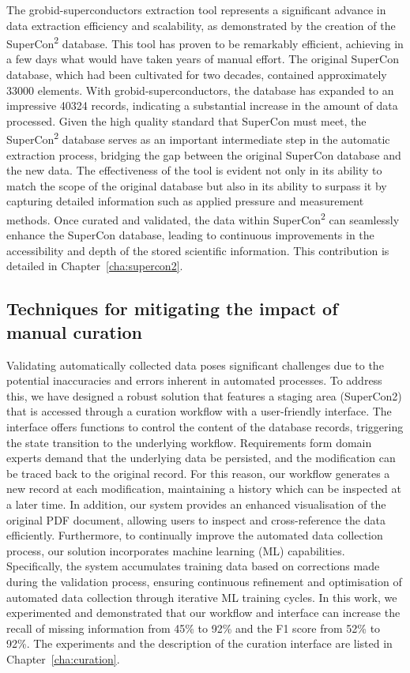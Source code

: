 The grobid-superconductors extraction tool represents a significant advance in data extraction efficiency and scalability, as demonstrated by the creation of the SuperCon\textsuperscript{2} database. 
This tool has proven to be remarkably efficient, achieving in a few days what would have taken years of manual effort. 
The original SuperCon database, which had been cultivated for two decades, contained approximately 33000 elements. 
With grobid-superconductors, the database has expanded to an impressive 40324 records, indicating a substantial increase in the amount of data processed. 
Given the high quality standard that SuperCon must meet, the SuperCon\textsuperscript{2} database serves as an important intermediate step in the automatic extraction process, bridging the gap between the original SuperCon database and the new data. 
The effectiveness of the tool is evident not only in its ability to match the scope of the original database but also in its ability to surpass it by capturing detailed information such as applied pressure and measurement methods. Once curated and validated, the data within SuperCon\textsuperscript{2} can seamlessly enhance the SuperCon database, leading to continuous improvements in the accessibility and depth of the stored scientific information.
This contribution is detailed in Chapter~\ref{cha:supercon2}.

\subsection{Techniques for mitigating the impact of manual curation}
\label{sec:intro-curation}

Validating automatically collected data poses significant challenges due to the potential inaccuracies and errors inherent in automated processes. 
To address this, we have designed a robust solution that features a staging area (SuperCon2) that is accessed through a curation workflow with a user-friendly interface. 
The interface offers functions to control the content of the database records, triggering the state transition to the underlying workflow. 
Requirements form domain experts demand that the underlying data be persisted, and the modification can be traced back to the original record. For this reason, our workflow generates a new record at each modification, maintaining a history which can be inspected at a later time. 
In addition, our system provides an enhanced visualisation of the original PDF document, allowing users to inspect and cross-reference the data efficiently. 
Furthermore, to continually improve the automated data collection process, our solution incorporates machine learning (ML) capabilities. 
Specifically, the system accumulates training data based on corrections made during the validation process, ensuring continuous refinement and optimisation of automated data collection through iterative ML training cycles.
In this work, we experimented and demonstrated that our workflow and interface can increase the recall of missing information from 45\% to 92\% and the F1 score from 52\% to 92\%. 
The experiments and the description of the curation interface are listed in Chapter~\ref{cha:curation}.
